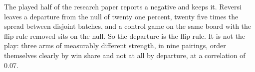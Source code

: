 The played half of the research paper reports a negative and keeps it. Reversi leaves a departure from the
null of twenty one percent, twenty five times the spread between disjoint batches, and a control
game on the same board with the flip rule removed sits on the null. So the departure is the flip
rule. It is not the play: three arms of measurably different strength, in nine pairings, order
themselves clearly by win share and not at all by departure, at a correlation of 0.07.
\cleardoublepage
